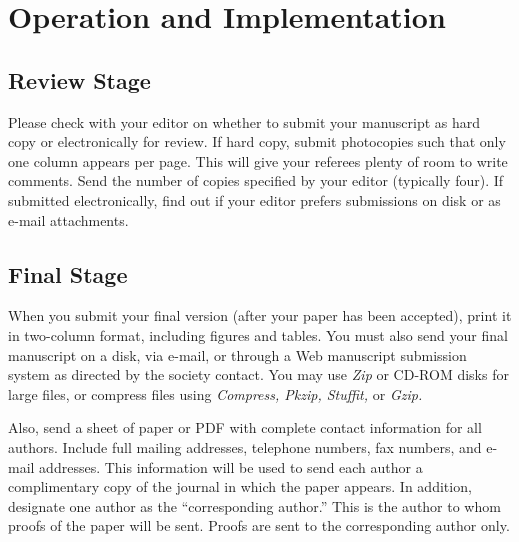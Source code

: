 \documentclass[transmag, onecolumn]{IEEEtran}
\begin{document}
\section{Operation and Implementation}



\subsection{Review Stage}
Please check with your editor on whether to submit your manuscript as hard 
copy or electronically for review. If hard copy, submit photocopies such 
that only one column appears per page. This will give your referees plenty 
of room to write comments. Send the number of copies specified by your 
editor (typically four). If submitted electronically, find out if your 
editor prefers submissions on disk or as e-mail attachments.

\subsection{Final Stage}
When you submit your final version (after your paper has been accepted), 
print it in two-column format, including figures and tables. You must also 
send your final manuscript on a disk, via e-mail, or through a Web 
manuscript submission system as directed by the society contact. You may use 
\emph{Zip} or CD-ROM disks for large files, or compress files using \emph{Compress, Pkzip, Stuffit,} or \emph{Gzip.} 

Also, send a sheet of paper or PDF with complete contact information for all 
authors. Include full mailing addresses, telephone numbers, fax numbers, and 
e-mail addresses. This information will be used to send each author a 
complimentary copy of the journal in which the paper appears. In addition, 
designate one author as the ``corresponding author.'' This is the author to 
whom proofs of the paper will be sent. Proofs are sent to the corresponding 
author only.
\end{document}
